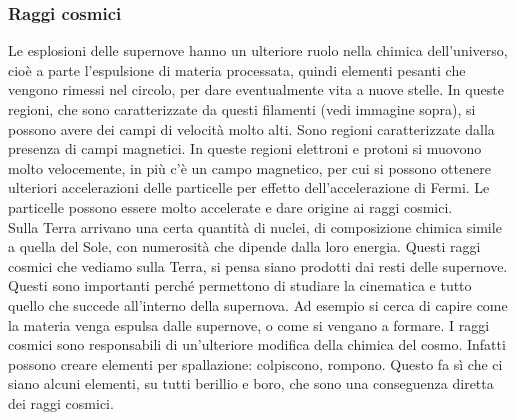 \documentclass[a4paper,11pt]{article}
\begin{document}
\subsubsection{Raggi cosmici}
Le esplosioni delle supernove hanno un ulteriore ruolo nella chimica dell'universo, cioè a parte l'espulsione di materia processata, quindi elementi pesanti che vengono rimessi nel circolo, per dare eventualmente vita a nuove stelle. In queste regioni, che sono caratterizzate da questi filamenti (vedi immagine sopra), si possono avere dei campi di velocità molto alti. Sono regioni caratterizzate dalla presenza di campi magnetici. In queste regioni elettroni e protoni si muovono molto velocemente, in più c'è un campo magnetico, per cui si possono ottenere ulteriori accelerazioni delle particelle per effetto dell'accelerazione di Fermi. Le particelle possono essere molto accelerate e dare origine ai raggi cosmici. \\ Sulla Terra arrivano una certa quantità di nuclei, di composizione chimica simile a quella del Sole, con numerosità che dipende dalla loro energia. Questi raggi cosmici che vediamo sulla Terra, si pensa siano prodotti dai resti delle supernove. Questi sono importanti perché permettono di studiare la cinematica e tutto quello che succede all'interno della supernova. Ad esempio si cerca di capire come la materia venga espulsa dalle supernove, o come si vengano a formare. I raggi cosmici sono responsabili di un'ulteriore modifica della chimica del cosmo. Infatti possono creare elementi per spallazione: colpiscono, rompono. Questo fa sì che ci siano alcuni elementi, su tutti berillio e boro, che sono una conseguenza diretta dei raggi cosmici. \\ 
\end{document}
